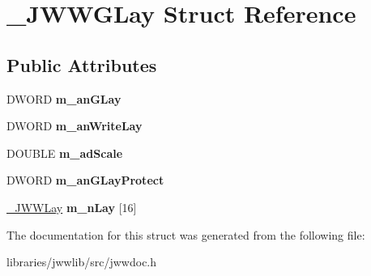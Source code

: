 \hypertarget{struct__JWWGLay}{\section{\-\_\-\-J\-W\-W\-G\-Lay Struct Reference}
\label{struct__JWWGLay}
}
\subsection*{Public Attributes}
\begin{DoxyCompactItemize}
\item 
\hypertarget{struct__JWWGLay_a7f4bba6cc2f9f59b28d2dc08a9dcd708}{D\-W\-O\-R\-D {\bfseries m\-\_\-an\-G\-Lay}}\label{struct__JWWGLay_a7f4bba6cc2f9f59b28d2dc08a9dcd708}

\item 
\hypertarget{struct__JWWGLay_a844fdb32ab704363aa2547af0578f5a8}{D\-W\-O\-R\-D {\bfseries m\-\_\-an\-Write\-Lay}}\label{struct__JWWGLay_a844fdb32ab704363aa2547af0578f5a8}

\item 
\hypertarget{struct__JWWGLay_a56269a87d305fc886b031b44b680a5de}{D\-O\-U\-B\-L\-E {\bfseries m\-\_\-ad\-Scale}}\label{struct__JWWGLay_a56269a87d305fc886b031b44b680a5de}

\item 
\hypertarget{struct__JWWGLay_a1c458a7c6aba49a32d2784078ec28711}{D\-W\-O\-R\-D {\bfseries m\-\_\-an\-G\-Lay\-Protect}}\label{struct__JWWGLay_a1c458a7c6aba49a32d2784078ec28711}

\item 
\hypertarget{struct__JWWGLay_a524da686e293891206876587159e8022}{\hyperlink{struct__JWWLay}{\-\_\-\-J\-W\-W\-Lay} {\bfseries m\-\_\-n\-Lay} \mbox{[}16\mbox{]}}\label{struct__JWWGLay_a524da686e293891206876587159e8022}

\end{DoxyCompactItemize}


The documentation for this struct was generated from the following file\-:\begin{DoxyCompactItemize}
\item 
libraries/jwwlib/src/jwwdoc.\-h\end{DoxyCompactItemize}
